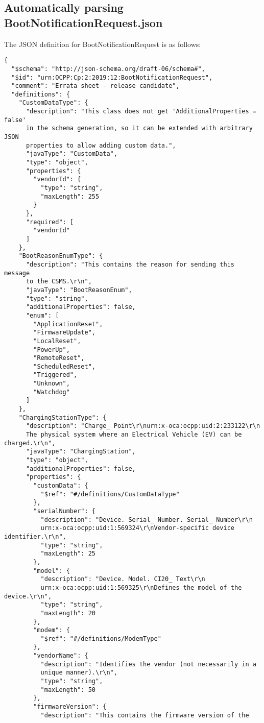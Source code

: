 \documentclass[12pt,openany,a4paper]{book}
\begin{document}
\subsection{Automatically parsing BootNotificationRequest.json}
The JSON definition for BootNotificationRequest is as follows:
\begin{verbatim}
{
  "$schema": "http://json-schema.org/draft-06/schema#",
  "$id": "urn:OCPP:Cp:2:2019:12:BootNotificationRequest",
  "comment": "Errata sheet - release candidate",
  "definitions": {
    "CustomDataType": {
      "description": "This class does not get 'AdditionalProperties = false' 
      in the schema generation, so it can be extended with arbitrary JSON 
      properties to allow adding custom data.",
      "javaType": "CustomData",
      "type": "object",
      "properties": {
        "vendorId": {
          "type": "string",
          "maxLength": 255
        }
      },
      "required": [
        "vendorId"
      ]
    },
    "BootReasonEnumType": {
      "description": "This contains the reason for sending this message 
      to the CSMS.\r\n",
      "javaType": "BootReasonEnum",
      "type": "string",
      "additionalProperties": false,
      "enum": [
        "ApplicationReset",
        "FirmwareUpdate",
        "LocalReset",
        "PowerUp",
        "RemoteReset",
        "ScheduledReset",
        "Triggered",
        "Unknown",
        "Watchdog"
      ]
    },
    "ChargingStationType": {
      "description": "Charge_ Point\r\nurn:x-oca:ocpp:uid:2:233122\r\n
      The physical system where an Electrical Vehicle (EV) can be charged.\r\n",
      "javaType": "ChargingStation",
      "type": "object",
      "additionalProperties": false,
      "properties": {
        "customData": {
          "$ref": "#/definitions/CustomDataType"
        },
        "serialNumber": {
          "description": "Device. Serial_ Number. Serial_ Number\r\n
          urn:x-oca:ocpp:uid:1:569324\r\nVendor-specific device identifier.\r\n",
          "type": "string",
          "maxLength": 25
        },
        "model": {
          "description": "Device. Model. CI20_ Text\r\n
          urn:x-oca:ocpp:uid:1:569325\r\nDefines the model of the device.\r\n",
          "type": "string",
          "maxLength": 20
        },
        "modem": {
          "$ref": "#/definitions/ModemType"
        },
        "vendorName": {
          "description": "Identifies the vendor (not necessarily in a 
          unique manner).\r\n",
          "type": "string",
          "maxLength": 50
        },
        "firmwareVersion": {
          "description": "This contains the firmware version of the 

\end{verbatim}
\end{document}
